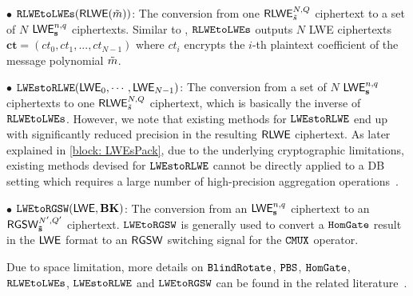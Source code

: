 $\bullet$ $\texttt{RLWEtoLWEs}({\mathsf{RLWE}}({\Tilde{m}}))$: The conversion from one ${\mathsf{RLWE}}^{N, Q}_{{\Tilde{s}}}$
ciphertext to a set of $N$ ${\mathsf{LWE}}^{n, q}_{{\mathbf{s}}}$ ciphertexts.
Similar to \cite{DBLP:journals/joc/ChillottiGGI20}, $\texttt{RLWEtoLWEs}$ 
outputs $N$ LWE ciphertexts $\mathbf{ct} = (ct_0, ct_1, ...,ct_{N-1})$
where $ct_i$ encrypts the $i$-th plaintext coefficient of the message 
polynomial ${\Tilde{m}}$.

$\bullet$ $\texttt{LWEstoRLWE}({\mathsf{LWE}}_{0}, \cdots, {\mathsf{LWE}}_{N-1})$:
The conversion from a set of $N$ ${\mathsf{LWE}}^{n, q}_{{\mathbf{s}}}$ ciphertexts to one
${\mathsf{RLWE}}^{N, Q}_{{\Tilde{s}}}$ ciphertext, which is basically the inverse of $\texttt{RLWEtoLWEs}$.
However, we note that existing methods for $\texttt{LWEstoRLWE}$ end up
with significantly reduced precision in the resulting ${\mathsf{RLWE}}$
ciphertext.
As later explained in \cref{block: LWEsPack}, due to the 
underlying cryptographic limitations, existing methods devised 
for $\texttt{LWEstoRLWE}$ cannot be directly
applied to a DB setting which requires a large number of
high-precision aggregation operations~\cite{pegasus,conversionhaochen}.

$\bullet$ $\texttt{LWEtoRGSW}({\mathsf{LWE}}, {\mathbf{BK}})$: The conversion from an ${\mathsf{LWE}}^{n, q}_{{\mathbf{s}}}$ ciphertext
to an ${\mathsf{RGSW}}^{N', Q'}_{{\bf{{\Tilde{s}}}}}$ ciphertext. $\texttt{LWEtoRGSW}$ is generally used to convert
a $\texttt{HomGate}$ result in the ${\mathsf{LWE}}$ format to an ${\mathsf{RGSW}}$ switching signal for the $\texttt{CMUX}$
operator. 

Due to space limitation, more details on $\texttt{BlindRotate}$, $\texttt{PBS}$, $\texttt{HomGate}$,
$\texttt{RLWEtoLWEs}$, $\texttt{LWEstoRLWE}$ and $\texttt{LWEtoRGSW}$ can be found in the related 
literature~\cite{DBLP:conf/asiacrypt/tfhepbs,conversionhaochen}.


